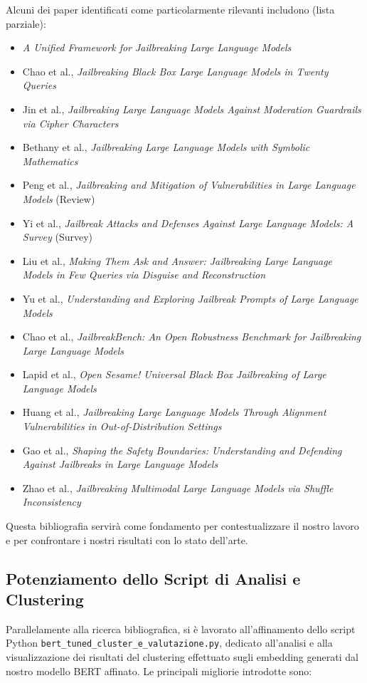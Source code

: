 \documentclass[11pt, a4paper]{article}
\begin{document}
Alcuni dei paper identificati come particolarmente rilevanti includono (lista parziale):
\begin{itemize}
    \item \textit{A Unified Framework for Jailbreaking Large Language Models}
    \item Chao et al., \textit{Jailbreaking Black Box Large Language Models in Twenty Queries}
    \item Jin et al., \textit{Jailbreaking Large Language Models Against Moderation Guardrails via Cipher Characters}
    \item Bethany et al., \textit{Jailbreaking Large Language Models with Symbolic Mathematics}
    \item Peng et al., \textit{Jailbreaking and Mitigation of Vulnerabilities in Large Language Models} (Review)
    \item Yi et al., \textit{Jailbreak Attacks and Defenses Against Large Language Models: A Survey} (Survey)
    \item Liu et al., \textit{Making Them Ask and Answer: Jailbreaking Large Language Models in Few Queries via Disguise and Reconstruction}
    \item Yu et al., \textit{Understanding and Exploring Jailbreak Prompts of Large Language Models}
    \item Chao et al., \textit{JailbreakBench: An Open Robustness Benchmark for Jailbreaking Large Language Models}
    \item Lapid et al., \textit{Open Sesame! Universal Black Box Jailbreaking of Large Language Models}
    \item Huang et al., \textit{Jailbreaking Large Language Models Through Alignment Vulnerabilities in Out-of-Distribution Settings}
    \item Gao et al., \textit{Shaping the Safety Boundaries: Understanding and Defending Against Jailbreaks in Large Language Models}
    \item Zhao et al., \textit{Jailbreaking Multimodal Large Language Models via Shuffle Inconsistency}
\end{itemize}
Questa bibliografia servirà come fondamento per contestualizzare il nostro lavoro e per confrontare i nostri risultati con lo stato dell'arte.

\subsection{Potenziamento dello Script di Analisi e Clustering}
Parallelamente alla ricerca bibliografica, si è lavorato all'affinamento dello script Python \texttt{bert\_tuned\_cluster\_e\_valutazione.py}, dedicato all'analisi e alla visualizzazione dei risultati del clustering effettuato sugli embedding generati dal nostro modello BERT affinato.
Le principali migliorie introdotte sono:
\end{document}
